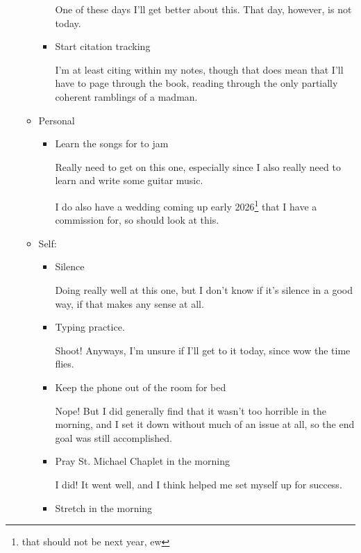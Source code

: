 \documentclass[12pt]{article}
\renewcommand{\,}{\textsuperscript{,}}
\begin{document}
\begin{itemize}
\begin{itemize}
\begin{itemize}
One of these days I'll get better about this. That day, however, is not today.

\item Start citation tracking

I'm at least citing within my notes, though that does mean that I'll have to page through the book, reading through the only partially coherent ramblings of a madman.

\end{itemize}

\item Personal

\begin{itemize}

\item Learn the songs for to jam

Really need to get on this one, especially since I also really need to learn and write some guitar music.

I do also have a wedding coming up early 2026\footnote{that should not be next year, ew} that I have a commission for, so should look at this.

\end{itemize}

\item Self:

\begin{itemize}

\item Silence

Doing really well at this one, but I don't know if it's silence in a good way, if that makes any sense at all.

\item Typing practice.

Shoot! Anyways, I'm unsure if I'll get to it today, since wow the time flies.

\item Keep the phone out of the room for bed

Nope! But I did generally find that it wasn't too horrible in the morning, and I set it down without much of an issue at all, so the end goal was still accomplished.

\item Pray St. Michael Chaplet in the morning

I did! It went well, and I think helped me set myself up for success.

\item Stretch in the morning


\end{itemize}
\end{itemize}
\end{itemize}
\end{document}
